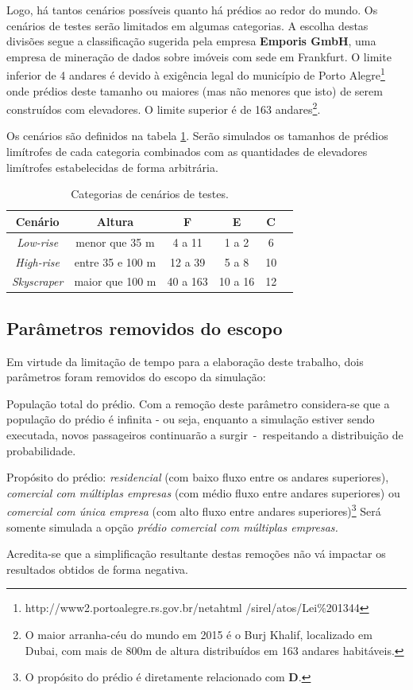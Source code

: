 Logo, há tantos cenários possíveis quanto há prédios ao redor do mundo. Os
cenários de testes serão limitados em algumas categorias. A escolha destas
divisões segue a classificação \cite{Emporis15} sugerida pela empresa
\textbf{Emporis GmbH}, uma empresa de mineração de dados sobre imóveis com sede
em Frankfurt. O limite inferior de 4 andares é devido à exigência legal do
município de Porto Alegre\footnote{http://www2.portoalegre.rs.gov.br/netahtml
/sirel/atos/Lei\%201344} onde prédios deste tamanho ou maiores (mas não menores
que isto) de serem construídos com elevadores. O limite superior é de 163
andares\footnote{O maior arranha-céu do mundo em 2015 é o Burj Khalif,
localizado em Dubai, com mais de 800m de altura distribuídos em 163 andares
habitáveis.}.

Os cenários são definidos na tabela \ref{tab:cenarios}. Serão simulados os
tamanhos de prédios limítrofes de cada categoria combinados com as quantidades
de elevadores limítrofes estabelecidas de forma arbitrária.

\begin{table}[htb!]
\centering
\caption{Categorias de cenários de testes.}
\label{tab:cenarios}
\begin{tabular}{|c|c|c|c|c|c|}
\hline
{\bf Cenário} & {\bf Altura} & {\bf F}  & {\bf E} & {\bf C}
\\ \hline
{\it Low-rise}   & menor que 35 m    & 4 a 11         & 1 a 2   & 6  \\ \hline
{\it High-rise}  & entre 35 e 100 m  & 12 a 39        & 5 a 8   & 10 \\ \hline
{\it Skyscraper} & maior que 100 m   & 40 a 163       & 10 a 16 & 12 \\ \hline
\end{tabular}
\end{table}

\subsection{Parâmetros removidos do escopo}

Em virtude da limitação de tempo para a elaboração deste trabalho, dois
parâmetros foram removidos do escopo da simulação:

\begin{description}[leftmargin=!,labelwidth=\widthof{\bfseries Pu}]
  \item[P]
  População total do prédio. Com a remoção deste parâmetro considera-se que a
  população do prédio é infinita - ou seja, enquanto a simulação estiver sendo
  executada, novos passageiros continuarão a surgir~-~respeitando a distribuição
  de probabilidade.

  \item[Pu]
  Propósito do prédio: \textit{residencial} (com baixo fluxo entre os andares
  superiores), \textit{comercial com múltiplas empresas} (com médio fluxo entre
  andares superiores) ou \textit{comercial com única empresa} (com alto fluxo
  entre andares superiores)\footnote{O propósito do prédio é diretamente
  relacionado com \textbf{D}.} Será somente simulada a opção \textit{prédio
  comercial com múltiplas empresas.}
\end{description}

Acredita-se que a simplificação resultante destas remoções não vá impactar os
resultados obtidos de forma negativa.
